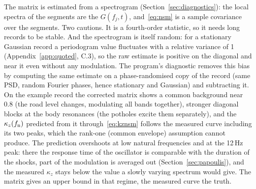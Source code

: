 The matrix is estimated from a spectrogram (Section~\ref{sec:diagnostics}): the local spectra of the
segments are the $G(f_j,t)$, and~\eqref{eq:nsm} is a sample covariance over the segments. Two cautions.
It is a fourth-order statistic, so it needs long records to be stable. And the spectrogram is itself
random: for a stationary Gaussian record a periodogram value fluctuates with a relative variance of 1
(Appendix~\ref{app:quoted}, C.3), so the raw estimate is positive on the diagonal and near it even
without any modulation. The program's diagnostic removes this bias by computing the same estimate on a
phase-randomised copy of the record (same PSD, random Fourier phases, hence stationary and Gaussian)
and subtracting it. On the example record the corrected matrix shows a common background near 0.8
(the road level changes, modulating all bands together), stronger diagonal blocks at the body
resonances (the potholes excite them separately), and the $\kappa_z(f_{\mathrm{n}})$ predicted from it
through~\eqref{eq:kznsm} follows the measured curve including its two peaks, which the rank-one
(common envelope) assumption cannot produce. The prediction overshoots at low natural frequencies and
at the 12\,Hz peak: there the response time of the oscillator is comparable with the duration of the
shocks, part of the modulation is averaged out (Section~\ref{sec:papoulis}), and the measured
$\kappa_z$ stays below the value a slowly varying spectrum would give. The matrix gives an upper
bound in that regime, the measured curve the truth.

